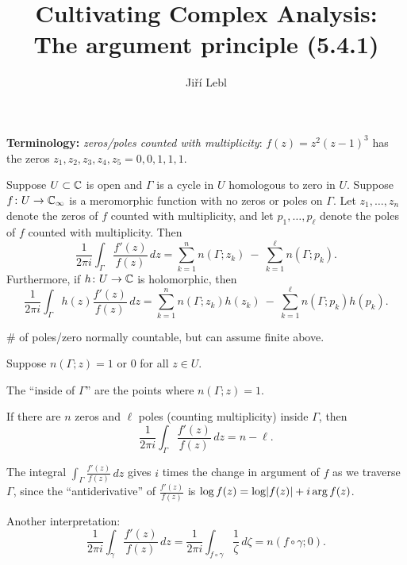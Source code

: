 \documentclass[10pt,aspectratio=169]{beamer}
\author{Ji\v{r}\'i Lebl}
\institute[OSU]{%
Departemento pri Matematiko de Oklahoma {\^S}tata Universitato}
\title{Cultivating Complex Analysis:\\%
The argument principle (5.4.1)}
\date{}
\begin{document}
\begin{frame}
\titlepage
\end{frame}

\begin{frame}
\textbf{Terminology:} \emph{zeros/poles counted with multiplicity}:
$f(z) = z^2{(z-1)}^3$ has the zeros $z_1,z_2,z_3,z_4,z_5 = 0,0,1,1,1$.

\pause

\begin{theorem}\label{thm:argprinc}
Suppose $U \subset {\mathbb{C}}$ is open and $\Gamma$ is
a cycle in $U$
homologous to zero in $U$.
Suppose $f \colon U \to {\mathbb{C}}_\infty$ is a meromorphic function with no zeros
or poles on $\Gamma$.
Let $z_1,\ldots,z_n$ denote the 
zeros of $f$ counted with multiplicity,
and let $p_1,\ldots,p_\ell$ denote the poles of $f$ counted with multiplicity.
Then
\begin{equation*}
\frac{1}{2\pi i}
\int_\Gamma \frac{f'(z)}{f(z)} \, dz
=
\sum_{k=1}^n n(\Gamma;z_k)
~
-
~
\sum_{k=1}^\ell n(\Gamma;p_k) .
\end{equation*}
\pause
Furthermore, if $h \colon U \to {\mathbb{C}}$ is holomorphic, then
\begin{equation*}
\frac{1}{2\pi i}
\int_\Gamma h(z) \frac{f'(z)}{f(z)} \, dz
=
\sum_{k=1}^n n(\Gamma;z_k)h(z_k) 
~
-
~
\sum_{k=1}^\ell n(\Gamma;p_k)h(p_k) .
\end{equation*}
\end{theorem}

\pause

\medskip

\# of poles/zero normally countable, but can assume finite above.

\end{frame}

\begin{frame}

Suppose $n(\Gamma;z) = 1$ or $0$ for all $z \in U$.

\medskip

The ``inside of
$\Gamma$'' are the points where $n(\Gamma;z)=1$.

\medskip

If there are
$n$ zeros and $\ell$ poles (counting multiplicity) inside $\Gamma$, then
\begin{equation*}
\frac{1}{2\pi i}
\int_\Gamma \frac{f'(z)}{f(z)} \, dz
= n - \ell .
\end{equation*}

\bigskip
\pause 

The integral $\int_{\Gamma} \frac{f'(z)}{f(z)} \, dz$
gives $i$ times the change in argument of $f$ as we traverse $\Gamma$,
since the ``antiderivative'' of 
$\frac{f'(z)}{f(z)}$ is $\log f(z) = \log \lvert {f(z)} \rvert + i \arg f(z)$.

\bigskip
\pause

Another interpretation:
\begin{equation*}
\frac{1}{2\pi i}
\int_{\gamma} \frac{f'(z)}{f(z)} \, dz = 
\frac{1}{2\pi i}
\int_{f \circ \gamma} \frac{1}{\zeta} \, d\zeta 
=
n(f \circ \gamma ; 0 )
.
\end{equation*}

\end{frame}
\end{document}
